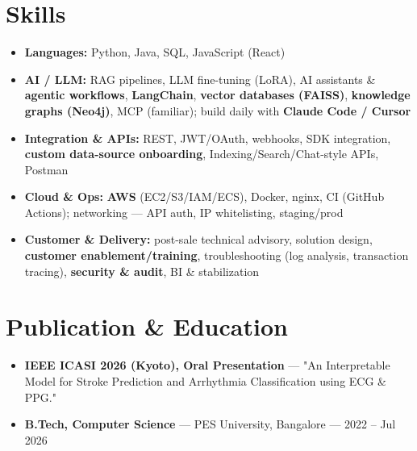 \documentclass[10pt,a4paper]{article}
\begin{document}
\section*{Skills}
\begin{itemize}
\item \textbf{Languages:} Python, Java, SQL, JavaScript (React)
\item \textbf{AI / LLM:} RAG pipelines, LLM fine-tuning (LoRA), AI assistants \& \textbf{agentic workflows}, \textbf{LangChain}, \textbf{vector databases (FAISS)}, \textbf{knowledge graphs (Neo4j)}, MCP (familiar); build daily with \textbf{Claude Code / Cursor}
\item \textbf{Integration \& APIs:} REST, JWT/OAuth, webhooks, SDK integration, \textbf{custom data-source onboarding}, Indexing/Search/Chat-style APIs, Postman
\item \textbf{Cloud \& Ops:} \textbf{AWS} (EC2/S3/IAM/ECS), Docker, nginx, CI (GitHub Actions); networking --- API auth, IP whitelisting, staging/prod
\item \textbf{Customer \& Delivery:} post-sale technical advisory, solution design, \textbf{customer enablement/training}, troubleshooting (log analysis, transaction tracing), \textbf{security \& audit}, BI \& stabilization
\end{itemize}
\section*{Publication \& Education}
\begin{itemize}
\item \textbf{IEEE ICASI 2026 (Kyoto), Oral Presentation} --- "An Interpretable Model for Stroke Prediction and Arrhythmia Classification using ECG \& PPG."
\item \textbf{B.Tech, Computer Science} --- PES University, Bangalore --- 2022 -- Jul 2026
\end{itemize}
\end{document}
